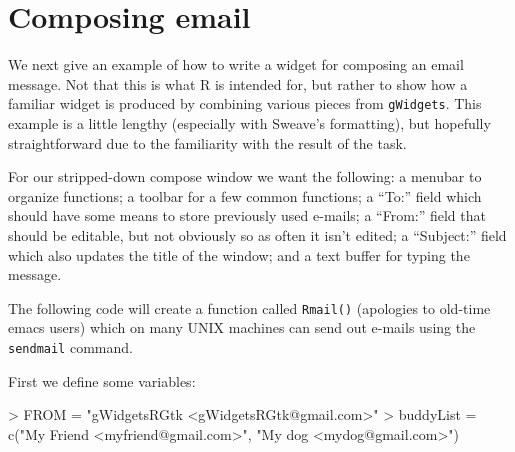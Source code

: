\documentclass[12pt]{article}
\newcommand{\RCode}[1]{\texttt{#1}}
\newcommand{\RFunc}[1]{\texttt{#1()}}
\begin{document}
\section{Composing email}

We next give an example of how to write a widget for composing an
email message. Not that this is what R is intended for, but rather to
show how a familiar widget is produced by combining various pieces
from \RCode{gWidgets}. This example is a little lengthy (especially
with Sweave's formatting), but hopefully straightforward due to the
familiarity with the result of the task.

For our stripped-down compose window we want the following: a menubar
to organize functions; a toolbar for a few common functions; a ``To:''
field which should have some means to store previously used e-mails; a
``From:'' field that should be editable, but not obviously so as often
it isn't edited; a ``Subject:'' field which also updates the title of
the window; and a text buffer for typing the message.

The following code will create a function called \RFunc{Rmail}
(apologies to old-time emacs users) which on many UNIX machines can
send out e-mails using the \RCode{sendmail} command.

First we define some variables:
\begin{Schunk}
\begin{Sinput}
> FROM = "gWidgetsRGtk <gWidgetsRGtk@gmail.com>"
> buddyList = c("My Friend <myfriend@gmail.com>", "My dog <mydog@gmail.com>")
\end{Sinput}
\end{Schunk}
\end{document}
